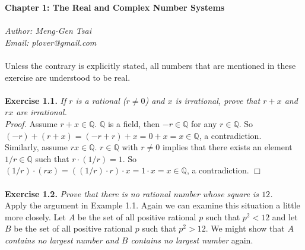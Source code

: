 \documentclass{article}
\begin{document}
\textbf{\Large Chapter 1: The Real and Complex Number Systems} \\\\



\emph{Author: Meng-Gen Tsai} \\
\emph{Email: plover@gmail.com} \\\\



Unless the contrary is explicitly stated, all numbers that are mentioned in these exercise
are understood to be real. \\\\






\textbf{Exercise 1.1.}
\emph{If $r$ is a rational ($r \neq 0$) and $x$ is irrational,
prove that $r + x$ and $rx$ are irrational.} \\

\emph{Proof.}
Assume $r + x \in \mathbb{Q}$.
$\mathbb{Q}$ is a field, then $-r \in \mathbb{Q}$ for any $r \in \mathbb{Q}$.
So $(-r) + (r + x) = (-r + r) + x = 0 + x = x \in \mathbb{Q}$, a contradiction. \\

Similarly, assume $rx \in \mathbb{Q}$. $r \in \mathbb{Q}$ with $r \neq 0$ implies that
there exists an element $1/r \in \mathbb{Q}$ such that $r \cdot (1/r) = 1$.
So $(1/r) \cdot (rx) = ((1/r) \cdot r) \cdot x = 1 \cdot x = x \in \mathbb{Q}$, a contradiction.
$\Box$ \\\\






\textbf{Exercise 1.2.}
\emph{Prove that there is no rational number whose square is $12$.} \\

Apply the argument in Example 1.1.
Again we can examine this situation a little more closely.
Let $A$ be the set of all positive rational $p$ such that $p^2 < 12$ and
let $B$ be the set of all positive rational $p$ such that $p^2 > 12$.
We might show that
\emph{$A$ contains no largest number and
$B$ contains no largest number} again. \\
\end{document}
